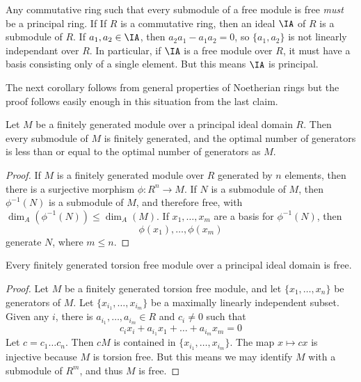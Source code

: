 \begin{remark}
    Any commutative ring such that every submodule of a free module is free \emph{must} be a principal ring. If If $R$ is a commutative ring, then an ideal $\IA$ of $R$ is a submodule of $R$. If $a_1,a_2 \in \IA$, then $a_2a_1 - a_1a_2 = 0$, so $\{ a_1,a_2 \}$ is not linearly independant over $R$. In particular, if $\IA$ is a free module over $R$, it must have a basis consisting only of a single element. But this means $\IA$ is principal.
\end{remark}

The next corollary follows from general properties of Noetherian rings but the proof follows easily enough in this situation from the last claim.

\begin{corollary}
    Let $M$ be a finitely generated module over a principal ideal domain $R$. Then every submodule of $M$ is finitely generated, and the optimal number of generators is less than or equal to the optimal number of generators as $M$.
\end{corollary}
\begin{proof}
    If $M$ is a finitely generated module over $R$ generated by $n$ elements, then there is a surjective morphism $\phi: R^n \to M$. If $N$ is a submodule of $M$, then $\phi^{-1}(N)$ is a submodule of $M$, and therefore free, with $\dim_A(\phi^{-1}(N)) \leq \dim_A(M)$. If $x_1,\dots,x_m$ are a basis for $\phi^{-1}(N)$, then
    \[ \phi(x_1),\dots, \phi(x_m) \]
    generate $N$, where $m \leq n$.
\end{proof}

\begin{lemma}
    Every finitely generated torsion free module over a principal ideal domain is free.
\end{lemma}
\begin{proof}
    Let $M$ be a finitely generated torsion free module, and let $\{ x_1, \dots, x_n \}$ be generators of $M$. Let $\{ x_{i_1}, \dots, x_{i_m} \}$ be a maximally linearly independent subset. Given any $i$, there is $a_{i_1}, \dots, a_{i_m} \in R$ and $c_i \neq 0$ such that
    \[ c_ix_i + a_{i_1} x_1 + \dots + a_{i_m} x_m = 0 \]
    Let $c = c_1 \dots c_n$. Then $cM$ is contained in $\{ x_{i_1}, \dots, x_{i_m} \}$. The map $x \mapsto cx$ is injective because $M$ is torsion free. But this means we may identify $M$ with a submodule of $R^m$, and thus $M$ is free.
\end{proof}

